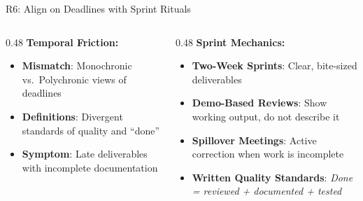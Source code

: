 \documentclass[aspectratio=169, 12pt]{beamer}
\newcommand{\presenter}[1]{\gdef\currentpresenter{#1}}
\gdef\currentpresenter{}
\begin{document}
\begin{frame}{R6: Align on Deadlines with Sprint Rituals}
\presenter{Presenter: Poorna Sai Kishore MARISETTI}

\vspace{0.3em}

\begin{columns}[T]
\begin{column}{0.48\textwidth}
\textbf{Temporal Friction:}
\begin{itemize}
    \item \textbf{Mismatch}: Monochronic vs.\ Polychronic views of deadlines
    \item \textbf{Definitions}: Divergent standards of quality and ``done''
    \item \textbf{Symptom}: Late deliverables with incomplete documentation
\end{itemize}
\end{column}

\begin{column}{0.48\textwidth}
\textbf{Sprint Mechanics:}
\begin{itemize}
    \item \textbf{Two-Week Sprints}: Clear, bite-sized deliverables
    \item \textbf{Demo-Based Reviews}: Show working output, do not describe it
    \item \textbf{Spillover Meetings}: Active correction when work is incomplete
    \item \textbf{Written Quality Standards}: \textit{Done = reviewed + documented + tested}
\end{itemize}
\end{column}
\end{columns}

\end{frame}

\end{document}
